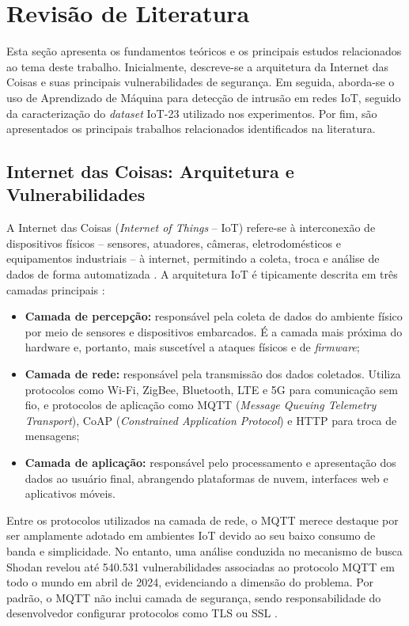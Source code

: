 \chapter{Revisão de Literatura}\label{chap:revisao}

Esta seção apresenta os fundamentos teóricos e os principais estudos relacionados ao tema deste trabalho. Inicialmente, descreve-se a arquitetura da Internet das Coisas e suas principais vulnerabilidades de segurança. Em seguida, aborda-se o uso de Aprendizado de Máquina para detecção de intrusão em redes IoT, seguido da caracterização do \textit{dataset} IoT-23 utilizado nos experimentos. Por fim, são apresentados os principais trabalhos relacionados identificados na literatura.

\section{Internet das Coisas: Arquitetura e Vulnerabilidades}\label{sec:iot}

A Internet das Coisas (\textit{Internet of Things} -- IoT) refere-se à interconexão de dispositivos físicos -- sensores, atuadores, câmeras, eletrodomésticos e equipamentos industriais -- à internet, permitindo a coleta, troca e análise de dados de forma automatizada \citep{Alfahaid2025}. A arquitetura IoT é tipicamente descrita em três camadas principais \citep{Alshahrani2020}:

\begin{itemize}[leftmargin=5em]
    \item \textbf{Camada de percepção:} responsável pela coleta de dados do ambiente físico por meio de sensores e dispositivos embarcados. É a camada mais próxima do hardware e, portanto, mais suscetível a ataques físicos e de \textit{firmware};
    \item \textbf{Camada de rede:} responsável pela transmissão dos dados coletados. Utiliza protocolos como Wi-Fi, ZigBee, Bluetooth, LTE e 5G para comunicação sem fio, e protocolos de aplicação como MQTT (\textit{Message Queuing Telemetry Transport}), CoAP (\textit{Constrained Application Protocol}) e HTTP para troca de mensagens;
    \item \textbf{Camada de aplicação:} responsável pelo processamento e apresentação dos dados ao usuário final, abrangendo plataformas de nuvem, interfaces web e aplicativos móveis.
\end{itemize}

Entre os protocolos utilizados na camada de rede, o MQTT merece destaque por ser amplamente adotado em ambientes IoT devido ao seu baixo consumo de banda e simplicidade. No entanto, uma análise conduzida no mecanismo de busca Shodan revelou até 540.531 vulnerabilidades associadas ao protocolo MQTT em todo o mundo em abril de 2024, evidenciando a dimensão do problema. Por padrão, o MQTT não inclui camada de segurança, sendo responsabilidade do desenvolvedor configurar protocolos como TLS ou SSL \citep{Alshahrani2020}.

